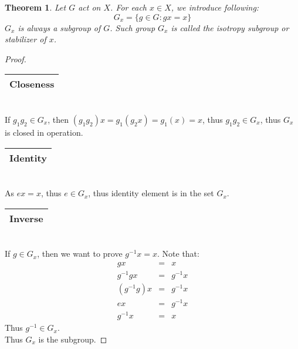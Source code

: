 \documentclass{article}
\theoremstyle{MyNonumberplain}
\theoremstyle{break}
\newtheorem*{proof}{Proof. }
\theoremstyle{break}
\newtheorem{theorem}{Theorem}[section]
\theoremstyle{break}
\theoremstyle{definition}
\theoremstyle{break}
\begin{document}
\begin{thmbox}
    \begin{theorem}
        Let $G$ act on $X$. For each $x \in X$, we introduce following:
        \[ G_x = \{ g \in G : g x = x \} \]
        $G_x$ is always a subgroup of $G$. Such group $G_x$ is called the isotropy
        subgroup or stabilizer of $x$.
    \end{theorem}
    \begin{prfbox}
        \begin{proof}
            \begin{tabular}{|c|}
                \hline
                Closeness\\
                \hline
              \end{tabular}\\
              
              If $g_1 g_2 \in G_x$, then $(g_1 g_2) x = g_1 (g_2 x) = g_1 (x) = x$, thus
              $g_1 g_2 \in G_x$, thus $G_x$ is closed in operation.\\
              
              \begin{tabular}{|c|}
                \hline
                Identity\\
                \hline
              \end{tabular}\\
              
              As $e x = x$, thus $e \in G_x$, thus identity element is in the set $G_x$.\\
              
              \begin{tabular}{|c|}
                \hline
                Inverse\\
                \hline
              \end{tabular}\\
              
              If $g \in G_x$, then we want to prove $g^{- 1} x = x$. Note that:
              \begin{eqnarray*}
                g x & = & x\\
                g^{- 1} g x & = & g^{- 1} x\\
                (g^{- 1} g) x & = & g^{- 1} x\\
                e x & = & g^{- 1} x\\
                g^{- 1} x & = & x
              \end{eqnarray*}
              Thus $g^{- 1} \in G_x$.\\
              
              Thus $G_x$ is the subgroup.
        \end{proof}
    \end{prfbox}
\end{thmbox}
\end{document}
